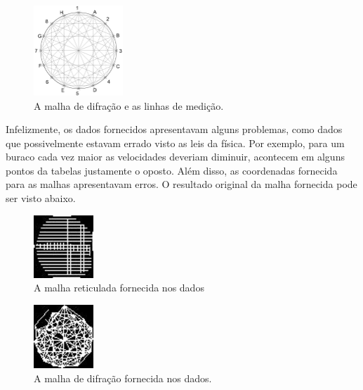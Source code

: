 \documentclass[10pt,a4paper]{article}
\begin{document}
\begin{figure}[h!]
  \begin{center}
    \leavevmode
    \includegraphics[width=0.3\textwidth]{malha2}
  \end{center}
  \label{fig:malha2}
  \caption{A malha de difração e as linhas de medição.}
\end{figure}

Infelizmente, os dados fornecidos apresentavam alguns problemas, como
dados que possivelmente estavam errado visto as leis da física.
Por exemplo, para um buraco cada vez maior as velocidades deveriam
diminuir, acontecem em alguns pontos da tabelas justamente o oposto.
Além disso, as coordenadas fornecida para as malhas apresentavam
erros.
O resultado original da malha fornecida pode ser visto abaixo.


\begin{figure}[h!]
  \begin{center}
    \leavevmode
    \includegraphics[width=0.2\textwidth]{1}
  \end{center}
  \label{fig:malha1}
  \caption{A malha reticulada fornecida nos dados}
\end{figure}

\begin{figure}[h!]
  \begin{center}
    \leavevmode
    \includegraphics[width=0.2\textwidth]{2}
  \end{center}
  \label{fig:malha2}
  \caption{A malha de difração fornecida nos dados.}
\end{figure}
\end{document}
